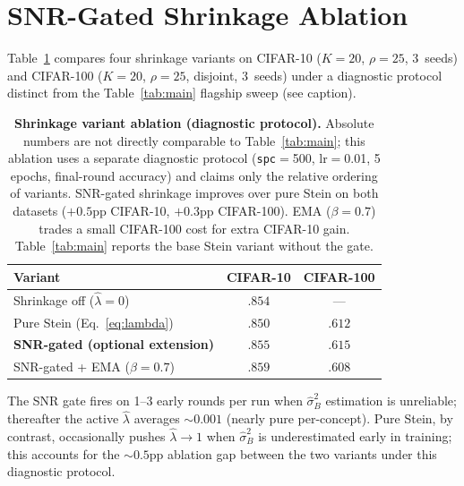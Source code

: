 \documentclass[11pt]{article}
\begin{document}
\section{SNR-Gated Shrinkage Ablation}
\label{app:shrinkage_ablation}

Table~\ref{tab:shrinkage_ablation} compares four shrinkage variants on CIFAR-10 ($K{=}20$, $\rho{=}25$, 3~seeds) and CIFAR-100 ($K{=}20$, $\rho{=}25$, disjoint, 3~seeds) under a diagnostic protocol distinct from the Table~\ref{tab:main} flagship sweep (see caption).

\begin{table}[h]
\centering
\caption{\textbf{Shrinkage variant ablation (diagnostic protocol).} Absolute numbers are not directly comparable to Table~\ref{tab:main}; this ablation uses a separate diagnostic protocol (\texttt{spc}$=$500, lr$=$0.01, 5 epochs, final-round accuracy) and claims only the relative ordering of variants. SNR-gated shrinkage improves over pure Stein on both datasets ($+0.5$pp CIFAR-10, $+0.3$pp CIFAR-100). EMA ($\beta{=}0.7$) trades a small CIFAR-100 cost for extra CIFAR-10 gain. Table~\ref{tab:main} reports the base Stein variant without the gate.}
\label{tab:shrinkage_ablation}
\small
\begin{tabular}{@{}lcc@{}}
\toprule
Variant & CIFAR-10 & CIFAR-100 \\
\midrule
Shrinkage off ($\hat\lambda{=}0$) & $.854$ & --- \\
Pure Stein (Eq.~\ref{eq:lambda}) & $.850$ & $.612$ \\
\textbf{SNR-gated (optional extension)} & $\mathbf{.855}$ & $\mathbf{.615}$ \\
SNR-gated + EMA ($\beta{=}0.7$) & $.859$ & $.608$ \\
\bottomrule
\end{tabular}
\end{table}

The SNR gate fires on 1--3 early rounds per run when $\hat\sigma_B^2$ estimation is unreliable; thereafter the active $\hat\lambda$ averages ${\sim}0.001$ (nearly pure per-concept).
Pure Stein, by contrast, occasionally pushes $\hat\lambda \to 1$ when $\hat\sigma_B^2$ is underestimated early in training; this accounts for the ${\sim}0.5$pp ablation gap between the two variants under this diagnostic protocol.


\end{document}
